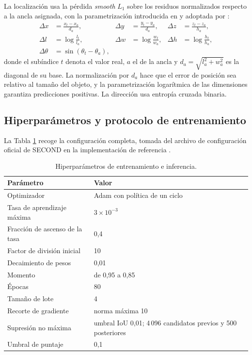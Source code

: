 \documentclass[11pt,letterpaper]{article}
\begin{document}
La localización usa la pérdida \textit{smooth} $L_1$ sobre los residuos normalizados respecto a la ancla asignada, con la parametrización introducida en \cite{zhou2018} y adoptada por \cite{yan2018}:
\begin{equation}
\begin{aligned}
\Delta x &= \frac{x_t - x_a}{d_a}, & \Delta y &= \frac{y_t - y_a}{d_a}, & \Delta z &= \frac{z_t - z_a}{h_a}, \\[2pt]
\Delta l &= \log\frac{l_t}{l_a}, & \Delta w &= \log\frac{w_t}{w_a}, & \Delta h &= \log\frac{h_t}{h_a}, \\[2pt]
\Delta \theta &= \sin(\theta_t - \theta_a),
\end{aligned}
\end{equation}
donde el subíndice $t$ denota el valor real, $a$ el de la ancla y $d_a = \sqrt{l_a^2 + w_a^2}$ es la diagonal de su base. La normalización por $d_a$ hace que el error de posición sea relativo al tamaño del objeto, y la parametrización logarítmica de las dimensiones garantiza predicciones positivas. La dirección usa entropía cruzada binaria.

\subsection{Hiperparámetros y protocolo de entrenamiento}

La Tabla \ref{tab:hiper} recoge la configuración completa, tomada del archivo de configuración oficial de SECOND en la implementación de referencia \cite{openpcdet}.

\begin{table}[htbp]
\caption{Hiperparámetros de entrenamiento e inferencia.}
\label{tab:hiper}
\centering
\small
\begin{tabular}{@{}ll@{}}
\toprule
\textbf{Parámetro} & \textbf{Valor} \\
\midrule
Optimizador & Adam con política de un ciclo \\
Tasa de aprendizaje máxima & $3 \times 10^{-3}$ \\
Fracción de ascenso de la tasa & 0,4 \\
Factor de división inicial & 10 \\
Decaimiento de pesos & 0,01 \\
Momento & de 0,95 a 0,85 \\
Épocas & 80 \\
Tamaño de lote & 4 \\
Recorte de gradiente & norma máxima 10 \\
Supresión no máxima & umbral IoU 0,01; 4\,096 candidatos previos y 500 posteriores \\
Umbral de puntaje & 0,1 \\
\bottomrule
\end{tabular}
\end{table}
\end{document}

